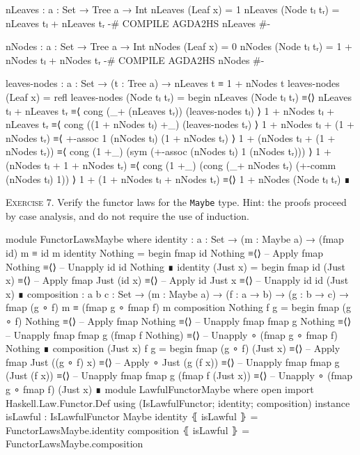 \documentclass{article}
\begin{document}
\begin{code}
nLeaves : {a : Set} → Tree a → Int
nLeaves (Leaf x) = 1
nLeaves (Node tₗ tᵣ) = nLeaves tₗ + nLeaves tᵣ
{-# COMPILE AGDA2HS nLeaves #-}

nNodes : {a : Set} → Tree a → Int
nNodes (Leaf x) = 0
nNodes (Node tₗ tᵣ) = 1 + nNodes tₗ + nNodes tᵣ
{-# COMPILE AGDA2HS nNodes #-}

leaves-nodes : {a : Set} → (t : Tree a)
    → nLeaves t ≡ 1 + nNodes t
leaves-nodes (Leaf x) = refl
leaves-nodes (Node tₗ tᵣ) =
  begin
    nLeaves (Node tₗ tᵣ)
  ≡⟨⟩
    nLeaves tₗ + nLeaves tᵣ
  ≡⟨ cong (_+ (nLeaves tᵣ)) (leaves-nodes tₗ) ⟩
    1 + nNodes tₗ + nLeaves tᵣ
  ≡⟨ cong ((1 + nNodes tₗ) +_) (leaves-nodes tᵣ) ⟩
    1 + nNodes tₗ + (1 + nNodes tᵣ)
  ≡⟨ +-assoc 1 (nNodes tₗ) (1 + nNodes tᵣ) ⟩
    1 + (nNodes tₗ + (1 + nNodes tᵣ))
  ≡⟨ cong (1 +_) (sym (+-assoc (nNodes tₗ) 1 (nNodes tᵣ))) ⟩
    1 + (nNodes tₗ + 1 + nNodes tᵣ)
  ≡⟨ cong (1 +_) (cong (_+ nNodes tᵣ) (+-comm (nNodes tₗ) 1)) ⟩
    1 + (1 + nNodes tₗ + nNodes tᵣ)
  ≡⟨⟩
    1 + nNodes (Node tₗ tᵣ)
  ∎
\end{code}

\noindent
\textsc{Exercise 7.} Verify the functor laws for the \texttt{Maybe} type. Hint: the proofs proceed by case analysis, and do not require the use of induction.

\begin{code}
module FunctorLawsMaybe where
  identity : {a : Set} → (m : Maybe a) → (fmap id) m ≡ id m
  identity Nothing =
    begin
      fmap id Nothing
    ≡⟨⟩ -- Apply fmap
      Nothing
    ≡⟨⟩ -- Unapply id
      id Nothing
    ∎
  identity (Just x) =
    begin
      fmap id (Just x)
    ≡⟨⟩ -- Apply fmap
      Just (id x)
    ≡⟨⟩ -- Apply id
      Just x
    ≡⟨⟩ -- Unapply id
      id (Just x)
    ∎
  composition : {a b c : Set}
    → (m : Maybe a) → (f : a → b) → (g : b → c)
    → fmap (g ∘ f) m ≡ (fmap g ∘ fmap f) m
  composition Nothing f g =
      begin
        fmap (g ∘ f) Nothing
      ≡⟨⟩ -- Apply fmap
        Nothing
      ≡⟨⟩ -- Unapply fmap
        fmap g Nothing
      ≡⟨⟩ -- Unapply fmap
        fmap g (fmap f Nothing)
      ≡⟨⟩ -- Unapply ∘
        (fmap g ∘ fmap f) Nothing
      ∎
  composition (Just x) f g =
    begin
      fmap (g ∘ f) (Just x)
    ≡⟨⟩ -- Apply fmap
      Just ((g ∘ f) x)
    ≡⟨⟩ -- Apply ∘
      Just (g (f x))
    ≡⟨⟩ -- Unapply fmap
      fmap g (Just (f x))
    ≡⟨⟩ -- Unapply fmap
      fmap g (fmap f (Just x))
    ≡⟨⟩ -- Unapply ∘
      (fmap g ∘ fmap f) (Just x)
    ∎
module LawfulFunctorMaybe where
  open import Haskell.Law.Functor.Def
    using (IsLawfulFunctor; identity; composition)
  instance
    isLawful : IsLawfulFunctor Maybe
    identity ⦃ isLawful ⦄ = FunctorLawsMaybe.identity
    composition ⦃ isLawful ⦄ = FunctorLawsMaybe.composition
\end{code}
\end{document}
